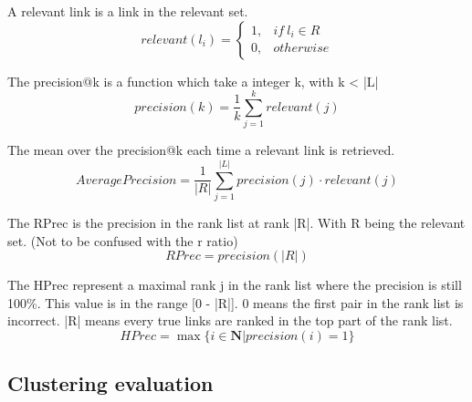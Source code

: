 \begin{definition}
  A relevant link is a link in the relevant set.
  \begin{equation}
    relevant(l_i) =
    \begin{cases}
      1, & if\ l_i \in R \\
      0, & otherwise
    \end{cases}
  \end{equation}
\end{definition}

\begin{definition}
  The precision@k is a function which take a integer k, with k < |L|
  \begin{equation}
    precision(k) = \frac{1}{k} \sum_{j=1}^{k} relevant(j)
  \end{equation}
\end{definition}

\begin{definition}
  The mean over the precision@k each time a relevant link is retrieved.
  \begin{equation}
    AveragePrecision = \frac{1}{|R|} \sum_{j=1}^{|L|} precision(j) \cdot relevant(j)
  \end{equation}
\end{definition}

\begin{definition}
  The RPrec is the precision in the rank list at rank |R|.
  With R being the relevant set. (Not to be confused with the r ratio)
  \begin{equation}
    RPrec = precision(|R|)
  \end{equation}
\end{definition}

\begin{definition}
  The HPrec represent a maximal rank j in the rank list where the precision is still 100\%.
  This value is in the range [0 - |R|].
  0 means the first pair in the rank list is incorrect.
  |R| means every true links are ranked in the top part of the rank list.
  \begin{equation}
    HPrec = \max\{i \in \mathbf{N} | precision(i) = 1\}
  \end{equation}
\end{definition}

\subsection{Clustering evaluation}


